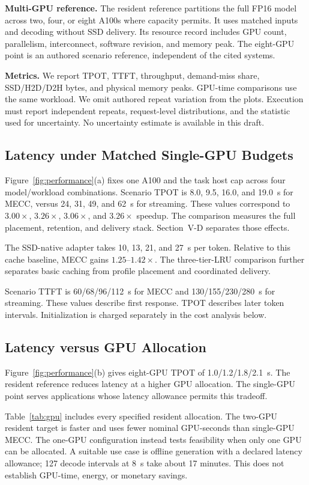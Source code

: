 \documentclass[conference,9pt,letterpaper]{IEEEtran}
\newcommand{\mecc}{\textsc{MECC}}
\begin{document}
\textbf{Multi-GPU reference.} The resident reference partitions the full FP16 model across two, four, or eight A100s where capacity permits. It uses matched inputs and decoding without SSD delivery. Its resource record includes GPU count, parallelism, interconnect, software revision, and memory peak. The eight-GPU point is an authored scenario reference, independent of the cited systems.

\textbf{Metrics.} We report TPOT, TTFT, throughput, demand-miss share, SSD/H2D/D2H bytes, and physical memory peaks. GPU-time comparisons use the same workload. We omit authored repeat variation from the plots. Execution must report independent repeats, request-level distributions, and the statistic used for uncertainty. No uncertainty estimate is available in this draft.

\subsection{Latency under Matched Single-GPU Budgets}
Figure~\ref{fig:performance}(a) fixes one A100 and the task host cap across four model/workload combinations. Scenario TPOT is 8.0, 9.5, 16.0, and 19.0~s for \mecc{}, versus 24, 31, 49, and 62~s for streaming. These values correspond to $3.00\times$, $3.26\times$, $3.06\times$, and $3.26\times$ speedup. The comparison measures the full placement, retention, and delivery stack. Section~V-D separates those effects.

The SSD-native adapter takes 10, 13, 21, and 27~s per token. Relative to this cache baseline, \mecc{} gains $1.25$--$1.42\times$. The three-tier-LRU comparison further separates basic caching from profile placement and coordinated delivery.

Scenario TTFT is 60/68/96/112~s for \mecc{} and 130/155/230/280~s for streaming. These values describe first response. TPOT describes later token intervals. Initialization is charged separately in the cost analysis below.

\subsection{Latency versus GPU Allocation}
Figure~\ref{fig:performance}(b) gives eight-GPU TPOT of 1.0/1.2/1.8/2.1~s. The resident reference reduces latency at a higher GPU allocation. The single-GPU point serves applications whose latency allowance permits this tradeoff.

Table~\ref{tab:gpu} includes every specified resident allocation. The two-GPU resident target is faster and uses fewer nominal GPU-seconds than single-GPU \mecc{}. The one-GPU configuration instead tests feasibility when only one GPU can be allocated. A suitable use case is offline generation with a declared latency allowance; 127 decode intervals at 8~s take about 17 minutes. This does not establish GPU-time, energy, or monetary savings.
\end{document}
